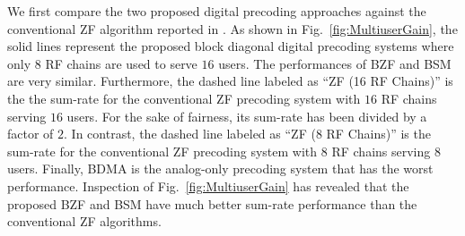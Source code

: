 \documentclass[conference]{IEEEtran}
\begin{document}
{We first compare the two proposed digital precoding approaches against the conventional ZF algorithm reported in \cite{alkhateeb2014channel}. As shown in Fig.~\ref{fig:MultiuserGain}, the solid lines represent the proposed block diagonal digital precoding systems where only $8$ RF chains are used to serve $16$ users. The performances of BZF and BSM are very similar. Furthermore, the dashed line labeled as ``ZF (16 RF Chains)'' is the the sum-rate for the conventional ZF precoding system with $16$ RF chains serving $16$ users. For the sake of fairness, its sum-rate has been divided by a factor of $2$. In contrast, the dashed line labeled as ``ZF (8 RF Chains)'' is the sum-rate for the conventional ZF precoding system with $8$ RF chains serving $8$ users. Finally, BDMA is the analog-only precoding system that has the worst performance. Inspection of Fig.~\ref{fig:MultiuserGain} has revealed that the proposed BZF and BSM have much better sum-rate performance than the conventional ZF algorithms.

}
\end{document}
